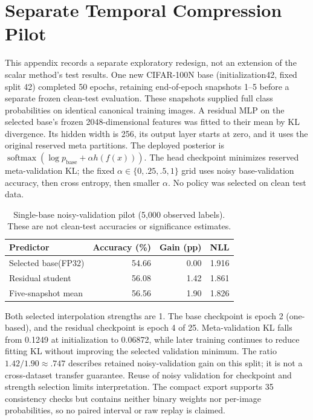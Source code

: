 \section{Separate Temporal Compression Pilot}
\label{sec:temporal-residual-validation}

This appendix records a separate exploratory redesign, not an extension of the
scalar method's test results. One new CIFAR-100N base (initialization42, fixed
split 42) completed 50 epochs, retaining end-of-epoch snapshots 1--5 before a separate frozen
clean-test evaluation. These snapshots supplied full class probabilities on
identical canonical training images. A residual MLP on the selected base's frozen
2048-dimensional features was fitted to their mean by KL divergence. Its hidden
width is 256, its output layer starts at zero, and it uses the original reserved
meta partitions. The deployed posterior is
$\operatorname{softmax}(\log p_{\mathrm{base}}+\alpha h(f(x)))$.
The head checkpoint minimizes reserved meta-validation KL; the fixed
$\alpha\in\{0,.25,.5,1\}$ grid uses noisy base-validation accuracy, then cross
entropy, then smaller $\alpha$. No policy was selected on clean test data.

\begin{table}[h]
\centering
\caption{Single-base noisy-validation pilot (5,000 observed labels). These are
not clean-test accuracies or significance estimates.}
\begin{tabular}{lrrr}
\toprule
Predictor & Accuracy (\%) & Gain (pp) & NLL\\
\midrule
Selected base(FP32) &54.66&0.00&1.916\\
Residual student &56.08&1.42&1.861\\
Five-snapshot mean &56.56&1.90&1.826\\
\bottomrule
\end{tabular}
\end{table}

Both selected interpolation strengths are 1. The base checkpoint is epoch 2
(one-based), and the residual checkpoint is epoch 4 of 25. Meta-validation KL
falls from 0.1249 at initialization to 0.06872, while later training continues to
reduce fitting KL without improving the selected validation minimum. The ratio
$1.42/1.90\approx.747$ describes retained noisy-validation gain on this split;
it is not a cross-dataset transfer guarantee. Reuse of noisy validation for
checkpoint and strength selection limits interpretation. The compact export
supports 35 consistency checks but contains neither binary weights nor per-image
probabilities, so no paired interval or raw replay is claimed.

